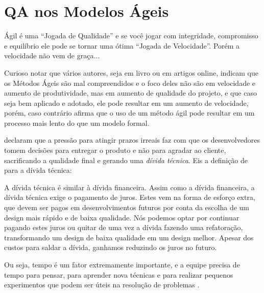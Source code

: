 \documentclass[
	12pt,				%
	openright,			%
	oneside,			%
	a4paper,			%
	english,			%
	brazil,				%
	]{abntex2}
\begin{document}
\section{QA nos Modelos Ágeis}
\begin{citacao}
Ágil é uma ``Jogada de Qualidade'' e se você jogar com integridade, compromisso e equilíbrio ele pode se tornar uma ótima ``Jogada de Velocidade''. Porém a velocidade não vem de graça...\cite{galen2014}
\end{citacao}

Curioso notar que vários autores, seja em livro ou em artigos online, indicam que os Métodos Ágeis são mal compreendidos e o foco deles não são em velocidade e aumento de produtividade, mas em aumento de qualidade do projeto, e que caso seja bem aplicado e adotado, ele pode resultar em um aumento de velocidade, porém, caso contrário  afirma que o uso de um método ágil pode resultar em um processo mais lento do que um modelo formal.

 declaram que a pressão para atingir prazos irreais faz com que os desenvolvedores tomem decisões para entregar o produto e não para agradar ao cliente, sacrificando a qualidade final e gerando uma \emph{dívida técnica}. Eis a definição de  para a dívida técnica:

\begin{citacao}
A dívida técnica é similar à dívida financeira. Assim como a dívida financeira, a dívida técnica exige o pagamento de juros. Estes vem na forma de esforço extra, que devem ser pagos em desenvolvimentos futuros por conta da escolha de um design mais rápido e de baixa qualidade. Nós podemos optar por continuar pagando estes juros ou quitar de uma vez a dívida fazendo uma refatoração, transformando um design de baixa qualidade em um design melhor. Apesar dos custos para saldar a dívida, ganhamos reduzindo os juros no futuro.
\end{citacao}

Ou seja, tempo é um fator extremamente importante, e a equipe precisa de tempo para pensar, para aprender nova técnicas e para realizar pequenos experimentos que podem ser úteis na resolução de problemas \cite{crispin2014}.
\end{document}
